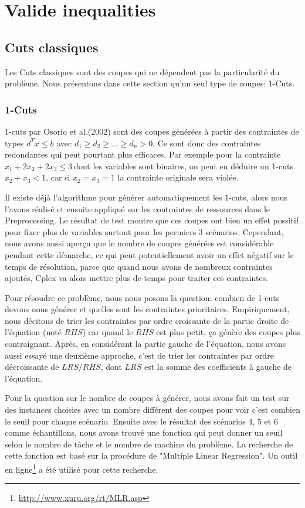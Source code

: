 \documentclass[twoside,fleqn]{EPURapport}
\begin{document}
\chapter{Valide inequalities}
\section{Cuts classiques}
Les Cuts classiques sont des coupes qui ne dépendent pas la particularité du problème. Nous présentons dans cette section qu'un seul type de coupes: 1-Cuts.
\subsection{1-Cuts}\label{cut2}
1-cuts par Osorio et al.(2002) sont des coupes générées à partir des contraintes de types $d^Tx \leq b$ avec $d_1  \geq d_2 \geq \dots \geq d_n > 0$. Ce sont donc des contraintes redondantes qui peut pourtant plus efficaces. Par exemple pour la contrainte $x_1+2x_2+2x_3\leq 3 \ $dont les variables sont binaires, on peut en déduire un 1-cuts $x_2+x_3 < 1$, car si $x_2 = x_3=1$ la contrainte originale sera violée.

Il existe déjà l'algorithme\cite{t2007enumeration} pour générer automatiquement les 1-cuts, alors nous l'avons réalisé et ensuite appliqué sur les contraintes de ressources dans le Preprocessing. Le résultat de test montre que ces coupes ont bien un effet possitif pour fixer plus de variables surtout pour les permiers 3 scénarios. Cependant, nous avons aussi aperçu que le nombre de coupes générées est considérable pendant cette démarche, ce qui peut potentiellement avoir un effet négatif sur le temps de résolution, parce que quand nous avons de nombreux contraintes ajoutés, Cplex va alors mettre plus de temps pour traiter ces contraintes.

Pour résoudre ce problème, nous nous posons la question: combien de 1-cuts devons nous générer et quelles sont les contraintes prioritaires. Empiriquement, nous décitons de trier les contraintes par ordre croissante de la partie droite de l'équation (noté $RHS$) car quand le $RHS$ est plus petit, ça génère des coupes plus contraignant. Après, en considérant la partie gauche de l'équation, nous avons aussi essayé une deuxième approche, c'est de trier les contraintes par ordre décroissante de $LRS/RHS$, dont $LRS$ est la somme des coefficients à gauche de l'équation.

Pour la question sur le nombre de coupes à générer, nous avons fait un test sur des instances choisies avec un nombre différent des coupes pour voir c'est combien le seuil pour chaque scénario. Ensuite avec le résultat des scénarios 4, 5 et 6 comme échantillons, nous avons trouvé une fonction qui peut donner un seuil selon le nombre de tâche et le nombre de machine du problème. La recherche de cette fonction est basé sur la procédure de "Multiple Linear Regression". Un outil en ligne\footnote{\url{http://www.xuru.org/rt/MLR.asp}} a été utilisé pour cette recherche.
\end{document}
